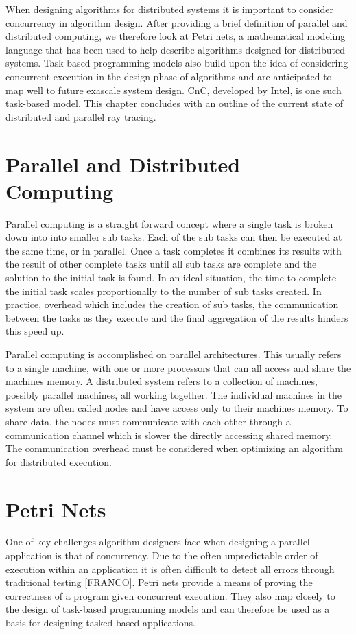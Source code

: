 When designing algorithms for distributed systems it is important to consider 
concurrency in algorithm design.  After providing a brief definition of parallel
and distributed computing, we therefore look at Petri nets, a mathematical 
modeling language that has been used to help describe algorithms designed for 
distributed systems.  Task-based programming models also build upon the idea of 
considering concurrent execution in the design phase of algorithms and are 
anticipated to map well to future exascale system design.  CnC, developed by 
Intel, is one such task-based model.  This chapter concludes with an outline of
the current state of distributed and parallel ray tracing.

\section{Parallel and Distributed Computing}

Parallel computing is a straight forward concept where a single task is broken 
down into into smaller sub tasks.  Each of the sub tasks can then be executed at
the same time, or in parallel.  Once a task completes it combines its results 
with the result of other complete tasks until all sub tasks are complete and the
solution to the initial task is found.  In an ideal situation, the time to 
complete the initial task scales proportionally to the number of sub tasks 
created.  In practice, overhead which includes the creation of sub tasks, 
the communication between the tasks as they execute and the final aggregation of 
the results hinders this speed up.

Parallel computing is accomplished on parallel architectures.  This usually 
refers to a single machine, with one or more processors that can all access and
share the machines memory.  A distributed system refers to a collection of
machines, possibly parallel machines, all working together.  The individual 
machines in the system are often called nodes and have access only to their 
machines memory.  To share data, the nodes must communicate with each other
through a communication channel which is slower the directly accessing shared
memory.  The communication overhead must be considered when optimizing an 
algorithm for distributed execution.

\section{Petri Nets}
\label{sec:petri-nets}
One of key challenges algorithm designers face when designing a parallel 
application is that of concurrency.  Due to the often unpredictable order of
execution within an application it is often difficult to detect all errors 
through traditional testing [FRANCO].  Petri nets provide a means of proving
the correctness of a program given concurrent execution.  They also map closely
to the design of task-based programming models and can therefore be used as a 
basis for designing tasked-based applications.

